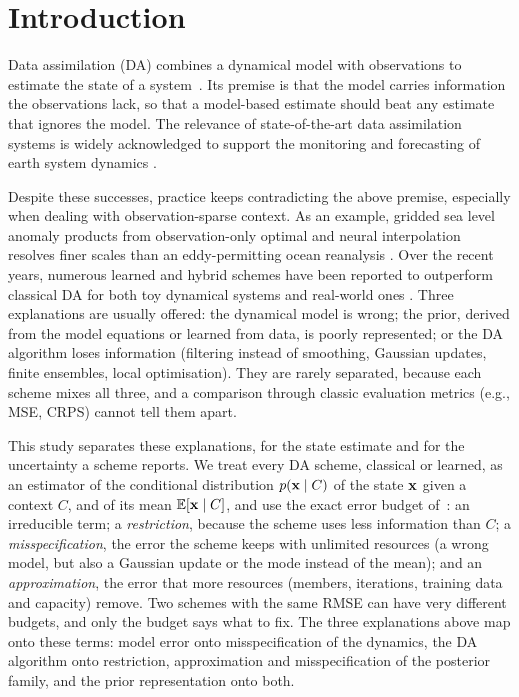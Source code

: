 \section{Introduction}\label{sec:intro}

Data assimilation (DA) combines a dynamical model with observations to estimate
the state of a system~\cite{carrassi_data_2018}. Its premise is that the model
carries information the observations lack, so that a model-based estimate should
beat any estimate that ignores the model. The relevance of state-of-the-art data assimilation systems is widely acknowledged to support the monitoring and forecasting of earth system dynamics \cite{bauer_quiet_2015,carrassi_data_2018,hersbach_era5_2020,moore_synthesis_2019}.

Despite these successes, practice keeps contradicting the above premise, especially when dealing with observation-sparse context. As an example, gridded sea level anomaly products from observation-only optimal and neural interpolation resolves finer scales than an eddy-permitting ocean reanalysis \cite{ballarotta_resolutions_2019,febvre_training_2023}. Over the recent years, numerous learned and hybrid schemes have been
reported to outperform classical DA for both toy dynamical systems and real-world ones
\cite{bocquet_bayesian_2020,brajard_combining_2021,rozet_score-based_2023}. Three explanations are usually offered: the dynamical model is wrong; the prior,
derived from the model equations or learned from data, is poorly represented; or the DA
algorithm loses information (filtering instead of smoothing, Gaussian updates, finite
ensembles, local optimisation). They are rarely separated, because each scheme mixes all
three, and a comparison through classic evaluation metrics (e.g., MSE, CRPS) cannot tell
them apart.

This study separates these explanations, for the state estimate and for the uncertainty a
scheme reports. We treat every DA scheme, classical or learned, as an estimator of the
conditional distribution $p(\mathbf{x} \mid C)$ of the state $\mathbf{x}$ given a context $C$, and of its
mean $\mathbb{E}[\mathbf{x} \mid C]$, and use the exact error budget of~\cite{fablet_not_2026}: an
irreducible term; a \emph{restriction}, because the scheme uses less information than
$C$; a \emph{misspecification}, the error the scheme keeps with unlimited resources
(a wrong model, but also a Gaussian update or the mode instead of the mean); and an
\emph{approximation}, the error that more resources (members, iterations, training data and
capacity) remove. Two schemes with the same RMSE can have very different budgets, and only
the budget says what to fix. The three explanations above map onto these terms: model
error onto misspecification of the dynamics, the DA algorithm onto restriction,
approximation and misspecification of the posterior family, and the prior representation
onto both.

